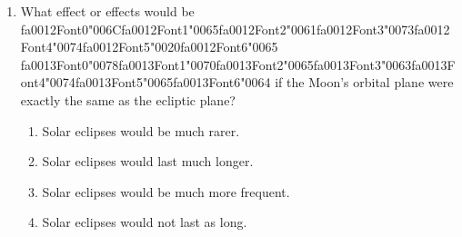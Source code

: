 \documentclass[12pt]{article}
\begin{document}
\begin{enumerate}[label=\arabic*.]
\begin{enumerate}[label=(\alph*)]
    \item Asteroids have substantial motion relative to the background stars
\end{enumerate}
\item What effect or effects would be {\csname fa0012Font0\endcsname\char"006C}{\csname fa0012Font1\endcsname\char"0065}{\csname fa0012Font2\endcsname\char"0061}{\csname fa0012Font3\endcsname\char"0073}{\csname fa0012Font4\endcsname\char"0074}{\csname fa0012Font5\endcsname\char"0020}{\csname fa0012Font6\endcsname\char"0065} {\csname fa0013Font0\endcsname\char"0078}{\csname fa0013Font1\endcsname\char"0070}{\csname fa0013Font2\endcsname\char"0065}{\csname fa0013Font3\endcsname\char"0063}{\csname fa0013Font4\endcsname\char"0074}{\csname fa0013Font5\endcsname\char"0065}{\csname fa0013Font6\endcsname\char"0064} if the Moon's orbital plane were exactly
the same as the ecliptic plane?
\begin{enumerate}[label=(\alph*)]
    \item Solar eclipses would be much rarer.
    \item Solar eclipses would last much longer.
    \item Solar eclipses would be much more frequent.
    \item Solar eclipses would not last as long.
\end{enumerate}
\end{enumerate}
\end{document}
